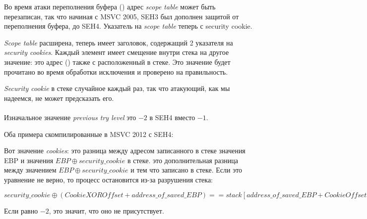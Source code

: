 \myindex{\BufferOverflow}
Во время атаки переполнения буфера ()
адрес \emph{scope table} может быть перезаписан, так что начиная с MSVC 2005, SEH3 был дополнен защитой от переполнения буфера, до SEH4.
Указатель на \emph{scope table} теперь  с \gls{security cookie}.

\emph{Scope table} расширена, теперь имеет заголовок, содержащий 2 указателя на \emph{security cookies}.
Каждый элемент имеет смещение внутри стека на другое значение: это адрес  (\EBP) также  с 
 расположенный в стеке.
Это значение будет прочитано во время обработки исключения и проверено на правильность.

\emph{Security cookie} в стеке случайное каждый раз, так что атакующий, как мы надеемся, не может предсказать его.\\
\\
Изначальное значение \emph{previous try level} это $-2$ в SEH4 вместо $-1$.

\def\SEHfour{1}


Оба примера скомпилированные в MSVC 2012 с SEH4:





Вот значение \emph{cookies}:  
это разница между адресом записанного в стеке значения EBP и значения $EBP \oplus security\_cookie$ в стеке.
 это дополнительная разница между значением $EBP \oplus security\_cookie$ и тем что записано в стеке.
Если это уравнение не верно, то процесс остановится из-за разрушения стека:

\begin{center}
$security\_cookie \oplus (CookieXOROffset + address\_of\_saved\_EBP) == stack[address\_of\_saved\_EBP + CookieOffset]$
\end{center}

Если  равно $-2$, это значит, что оно не присутствует.

\iffalse
\myindex{tracer}
Проверка \emph{cookies} также реализована в моем \tracer{},
смотрите \href{http://go.yurichev.com/17061}{GitHub} для деталей.\\
\\
Возможность переключиться назад на SEH3 все еще присутствует в компиляторах после (и включая) MSVC 2005, нужно включить
опцию \TT{/GS-}, впрочем, \ac{CRT}-код будет продолжать использовать SEH4.
\fi

